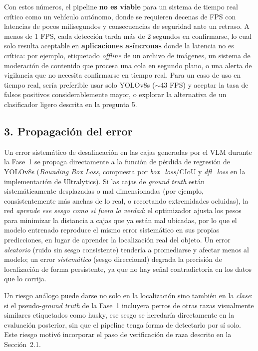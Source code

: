 \documentclass[11pt]{article}
\begin{document}
Con estos números, el pipeline \textbf{no es viable} para un sistema de tiempo real crítico como
un vehículo autónomo, donde se requieren decenas de FPS con latencias de pocos milisegundos y
consecuencias de seguridad ante un retraso. A menos de 1 FPS, cada detección tarda más de 2
segundos en confirmarse, lo cual solo resulta aceptable en \textbf{aplicaciones asíncronas}
donde la latencia no es crítica: por ejemplo, etiquetado \textit{offline} de un archivo de
imágenes, un sistema de moderación de contenido que procesa una cola en segundo plano, o una
alerta de vigilancia que no necesita confirmarse en tiempo real. Para un caso de uso en tiempo
real, sería preferible usar solo YOLOv8s ($\sim$43 FPS) y aceptar la tasa de falsos positivos
considerablemente mayor, o explorar la alternativa de un clasificador ligero descrita en la
pregunta 5.

\subsection*{3. Propagación del error}

Un error sistemático de desalineación en las cajas generadas por el VLM durante la Fase~1 se
propaga directamente a la función de pérdida de regresión de YOLOv8s (\textit{Bounding Box
Loss}, compuesta por \textit{box\_loss}/CIoU y \textit{dfl\_loss} en la implementación de
Ultralytics). Si las cajas de \textit{ground truth} están sistemáticamente desplazadas o mal
dimensionadas (por ejemplo, consistentemente más anchas de lo real, o recortando extremidades
ocluidas), la red \emph{aprende ese sesgo como si fuera la verdad}: el optimizador ajusta los
pesos para minimizar la distancia a cajas que ya están mal ubicadas, por lo que el modelo
entrenado reproduce el mismo error sistemático en sus propias predicciones, en lugar de aprender
la localización real del objeto. Un error \emph{aleatorio} (ruido sin sesgo consistente)
tendería a promediarse y afectar menos al modelo; un error \emph{sistemático} (sesgo
direccional) degrada la precisión de localización de forma persistente, ya que no hay señal
contradictoria en los datos que lo corrija.

Un riesgo análogo puede darse no solo en la localización sino también en la \emph{clase}: si el
pseudo-\textit{ground truth} de la Fase~1 incluyera perros de otras razas visualmente similares
etiquetados como husky, ese sesgo se heredaría directamente en la evaluación posterior, sin que
el pipeline tenga forma de detectarlo por sí solo. Este riesgo motivó incorporar el paso de
verificación de raza descrito en la Sección~2.1.
\end{document}
